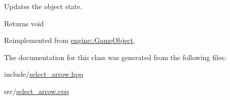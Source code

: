Updates the object state. 

\begin{DoxyReturn}{Returns}
void 
\end{DoxyReturn}


Reimplemented from \hyperlink{classengine_1_1_game_object}{engine\+::\+Game\+Object}.



The documentation for this class was generated from the following files\+:\begin{DoxyCompactItemize}
\item 
include/\hyperlink{select__arrow_8hpp}{select\+\_\+arrow.\+hpp}\item 
src/\hyperlink{select__arrow_8cpp}{select\+\_\+arrow.\+cpp}\end{DoxyCompactItemize}
